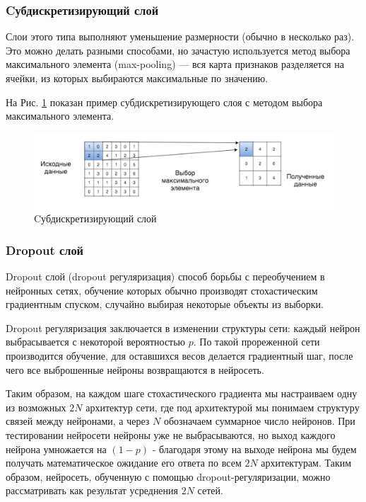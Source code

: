 \subsubsection{Cубдискретизирующий слой} \label{pooling_rev}
Слои этого типа выполняют уменьшение размерности (обычно в несколько раз). Это можно делать разными способами, но зачастую используется метод выбора максимального элемента (max-pooling) — вся карта признаков разделяется на ячейки, из которых выбираются максимальные по значению.

На Рис. \ref{fig:pooling_layer} показан пример субдискретизирующего слоя с методом выбора максимального элемента.
\begin{figure}[h]
    \centering
    \includegraphics [width=\textwidth*2/3] {images/pooling_layer.png}
    \caption{Cубдискретизирующий слой}
    \label{fig:pooling_layer}
\end{figure}

\subsubsection{Dropout слой} \label{dropout_rev}
Dropout слой (dropout регуляризация)\cite{dropout} способ борьбы с переобучением в нейронных сетях, обучение которых обычно производят стохастическим градиентным спуском, случайно выбирая некоторые объекты из выборки. 

Dropout регуляризация заключается в изменении структуры сети: каждый нейрон выбрасывается с некоторой вероятностью $p$. По такой прореженной сети производится обучение, для оставшихся весов делается градиентный шаг, после чего все выброшенные нейроны возвращаются в нейросеть.

Таким образом, на каждом шаге стохастического градиента мы настраиваем одну из возможных $2N$ архитектур сети, где под архитектурой мы понимаем структуру связей между нейронами, а через $N$ обозначаем суммарное число нейронов. При тестировании нейросети нейроны уже не выбрасываются, но выход каждого нейрона умножается на $(1 - p)$ - благодаря этому на выходе нейрона мы будем получать математическое ожидание его ответа по всем $2N$ архитектурам. Таким образом, нейросеть, обученную с помощью dropout-регуляризации, можно рассматривать как результат усреднения $2N$ сетей.

